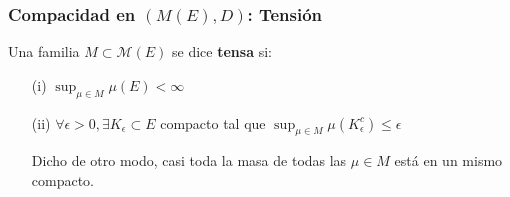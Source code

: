 \subsubsection{Compacidad en $(M(E),D)$: Tensión}
\begin{definition}
\label{def:tension}
Una familia $M\subset\mathcal{M}(E)$ se dice \textbf{tensa} si:
\begin{itemize}
    \item[(i)] $\displaystyle\sup_{\mu\in M}\mu(E)<\infty$
    \item[(ii)] $\forall \epsilon >0, \exists K_\epsilon\subset E$ compacto tal que $\displaystyle\sup_{\mu\in M}\mu(K_\epsilon^c)\leq \epsilon$
    
Dicho de otro modo, casi toda la masa de todas las $\mu\in M$ está en un mismo compacto.
\end{itemize}
\end{definition}


